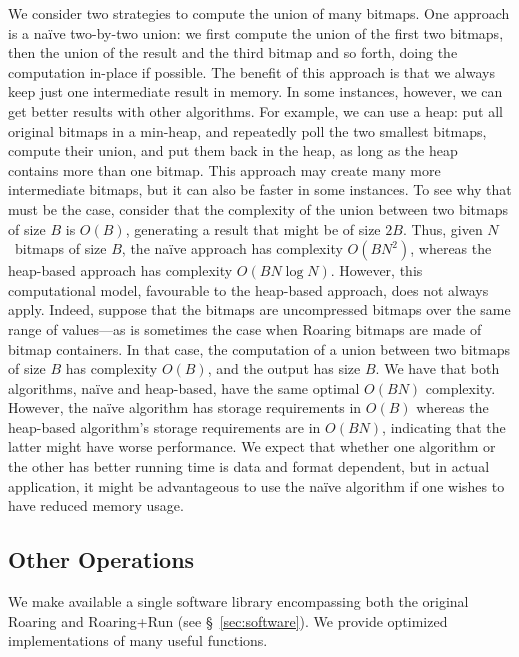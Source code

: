 \documentclass[times]{speauth}
\begin{document}
We consider two strategies to compute the union of many bitmaps. One approach is a na\"ive two-by-two union: we first compute the union of the first two bitmaps, then the union of the result and the third bitmap and so forth, doing the computation in-place if possible. The benefit of this approach is that we always keep just one intermediate result in memory. In some instances, however, we can
get better results with other algorithms. For example, we can use a heap: put all original bitmaps in a min-heap, and repeatedly poll the two smallest bitmaps, compute their union, and put them back in the heap, as long as the heap contains more than one bitmap. This approach may create many more intermediate bitmaps, but it can also be faster in some instances. To see why that must be the case, consider that the complexity of the union between two bitmaps of size $B$ is $O(B)$, generating a result that might be of size $2B$. Thus, given $N$~bitmaps of size $B$, the na\"ive  approach has complexity $O(B N^2)$, whereas the heap-based approach has complexity $O(B N \log N)$. However, this computational model, favourable to the heap-based approach, does not always apply. Indeed, suppose that the bitmaps are uncompressed bitmaps over the same range of values---as is sometimes the case when Roaring bitmaps are made of bitmap containers. In that case, the computation of a  union between two bitmaps of size $B$ has complexity $O(B)$, and the output has size $B$. We  have that both algorithms,
 na\"ive and heap-based, have the same optimal $O(B N)$ complexity. However, the na\"ive algorithm has storage requirements
in $O(B)$ whereas the heap-based algorithm's storage requirements are in $O(B N)$, indicating that the latter might have worse performance.
We expect that whether one algorithm or the other has better running time is data and format dependent, but in actual application, it might be advantageous to use the na\"ive algorithm if one wishes to have reduced memory usage.






\subsection{Other Operations}

We make available a single software library encompassing both the original Roaring and Roaring+Run (see \S~\ref{sec:software}). We provide optimized implementations of many useful functions.
\end{document}

